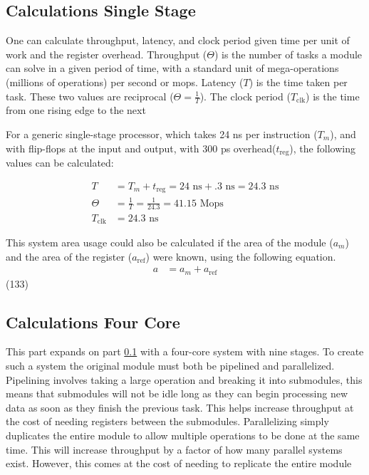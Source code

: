 \documentclass[11pt]{article}
\begin{document}
\subsection{Calculations Single Stage} \label{sec:single}

One can calculate throughput, latency, and clock period given time per unit of work and the register overhead.
Throughput ($\Theta$) is the number of tasks a module can solve in a given period of time, with a standard unit of mega-operations (millions of operations) per second or mops\cite{dally}.
Latency ($T$) is the time taken per task\cite{dally}. 
These two values are reciprocal ($\Theta = \frac{1}{T}$).
The clock period ($T_{\text{clk}}$) is the time from one rising edge to the next

For a generic single-stage processor, which takes 24 ns per instruction ($T_m$), and with flip-flops at the input and output, with 300 ps overhead($t_{\text{reg}}$), the following values can be calculated:

\begin{align}
    T &= T_m + t_{\text{reg}} = 24\text{ ns} + .3\text{ ns} = 24.3\text{ ns}\\
    \Theta &= \frac{1}{T} = \frac{1}{24.3} = 41.15\text{ Mops}\\
    T_{\text{clk}} &= 24.3\text{ ns}
\end{align}

This system area usage could also be calculated if the area of the module ($a_m$) and the area of the register ($a_{\text{ref}}$) were known, using the following equation.
\begin{align}
    a &= a_m + a_{\text{ref}}
\end{align}
(133)

\subsection{Calculations Four Core}

This part expands on part \ref{sec:single} with a four-core system with nine stages.
To create such a system the original module must both be pipelined and parallelized.
Pipelining involves taking a large operation and breaking it into submodules,
this means that submodules will not be idle long as they can begin processing new data as soon as they finish the previous task.
This helps increase throughput at the cost of needing registers between the submodules.
Parallelizing simply duplicates the entire module to allow multiple operations to be done at the same time.
This will increase throughput by a factor of how many parallel systems exist.
However, this comes at the cost of needing to replicate the entire module
\end{document}
